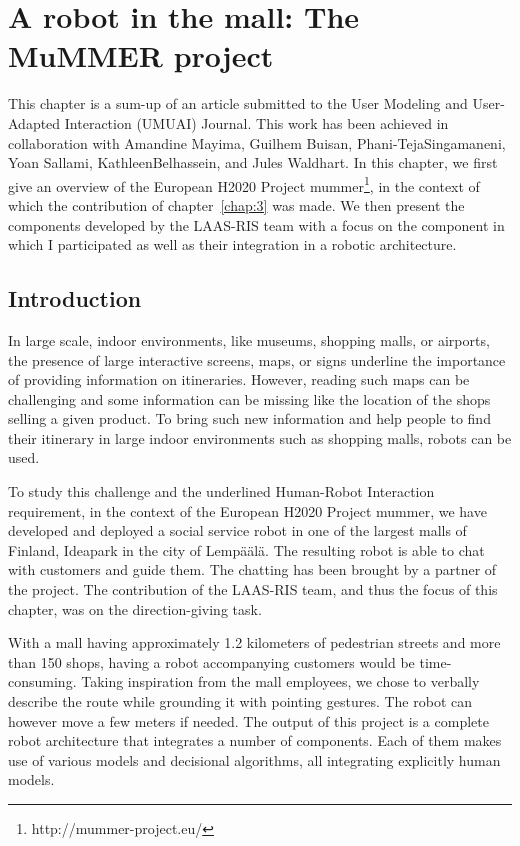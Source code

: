 \ifdefined{}
\else
\setcounter{chapter}{8} %
\dominitoc
\faketableofcontents
\fi

\chapter{A robot in the mall: The MuMMER project}
\minitoc

This chapter is a sum-up of an article submitted to the  User Modeling and User-Adapted Interaction (UMUAI) Journal. This work has been achieved in collaboration with Amandine Mayima, Guilhem Buisan, Phani-TejaSingamaneni, Yoan Sallami, KathleenBelhassein, and Jules Waldhart. In this chapter, we first give an overview of the European H2020 Project \acrfull{mummer}\footnote{http://mummer-project.eu/}, in the context of which the contribution of chapter~\ref{chap:3} was made. We then present the components developed by the LAAS-RIS team with a focus on the component in which I participated as well as their integration in a robotic architecture.

\section{Introduction}

In large scale, indoor environments, like museums, shopping malls, or airports, the presence of large interactive screens, maps, or signs underline the importance of providing information on itineraries. However, reading such maps can be challenging and some information can be missing like the location of the shops selling a given product. To bring such new information and help people to find their itinerary in large indoor environments such as shopping malls, robots can be used.

To study this challenge and the underlined Human-Robot Interaction requirement, in the context of the European H2020 Project \acrshort{mummer}, we have developed and deployed a social service robot in one of the largest malls of Finland, Ideapark in the city of Lemp\"a\"al\"a. The resulting robot is able to chat with customers and guide them. The chatting has been brought by a partner of the project. The contribution of the LAAS-RIS team, and thus the focus of this chapter, was on the direction-giving task.

With a mall having approximately 1.2 kilometers of pedestrian streets and more than 150 shops, having a robot accompanying customers would be time-consuming. Taking inspiration from the mall employees, we chose to verbally describe the route while grounding it with pointing gestures. The robot can however move a few meters if needed. %
The output of this project is a complete robot architecture that integrates a number of components. Each of them makes use of various models and decisional algorithms, all integrating explicitly human models.

